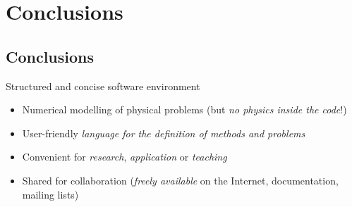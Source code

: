 
\part{Conclusions}

\begin{slide}


\begin{center}
\end{center}

\end{slide}


\chapter{Conclusions}

\begin{slide}

\begin{slideitemize}
\item Structured and concise software environment
\begin{itemize}
\item Numerical modelling of physical problems (but \emph{no physics inside the code}!)
\item User-friendly \emph{language for the definition of methods and problems}
\item Convenient for \emph{research}, \emph{application} or \emph{teaching}
\item Shared for collaboration (\emph{freely available} on the Internet,
documentation, mailing lists)
\end{itemize}
\end{slideitemize}

\end{slide}


